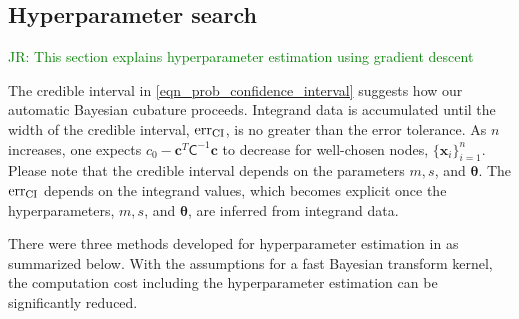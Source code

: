 \documentclass{svjour3}                     %
\newcommand{\bm}[1]{\boldsymbol{#1}}
\newcommand{\vtheta}{{\bm{\theta}}}
\newcommand{\vc}{\bm{c}}
\newcommand{\vx}{\bm{x}}
\newcommand{\mC}{\mathsf{C}}
\newcommand{\CI}{\textup{CI}}
\newcommand{\err}{\textup{err}}
\newcommand{\JRNote}[1]{{\textcolor{green}{JR: #1}}}
\begin{document}
\subsection{Hyperparameter search}
\JRNote{
	This section explains hyperparameter estimation using gradient descent}


The credible interval in \eqref{eqn_prob_confidence_interval} suggests how our automatic Bayesian cubature proceeds.  Integrand data is accumulated until the width of the credible interval, $\err_{\CI}$, is no greater than the error tolerance.  As $n$ increases, one expects $c_{0} - \vc^T\mC^{-1}\vc$ to decrease for well-chosen nodes, $\{\vx_i\}_{i=1}^n$. Please note that the credible interval depends on the parameters $m, s$, and $\vtheta$.
The $\err_{\CI}$ depends on the integrand values, which becomes explicit once the hyperparameters, $m, s$, and $\vtheta$, are inferred from integrand data. 






 

There were three methods developed for hyperparameter estimation in \cite{JagHic19a} as summarized below. With the assumptions for a fast Bayesian transform kernel,
the computation cost including the hyperparameter estimation can be significantly reduced.
\end{document}
